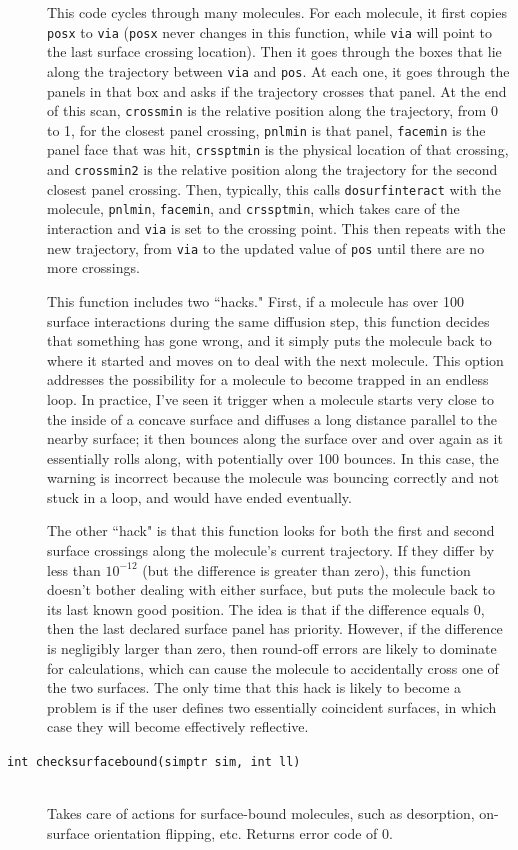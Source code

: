 \documentclass {scrbook}
\newcommand {\ttt} {\texttt}
\begin{document}
\begin{description}
This code cycles through many molecules. For each molecule, it first copies \ttt{posx} to \ttt{via} (\ttt{posx} never changes in this function, while \ttt{via} will point to the last surface crossing location). Then it goes through the boxes that lie along the trajectory between \ttt{via} and \ttt{pos}. At each one, it goes through the panels in that box and asks if the trajectory crosses that panel. At the end of this scan, \ttt{crossmin} is the relative position along the trajectory, from 0 to 1, for the closest panel crossing, \ttt{pnlmin} is that panel, \ttt{facemin} is the panel face that was hit, \ttt{crssptmin} is the physical location of that crossing, and \ttt{crossmin2} is the relative position along the trajectory for the second closest panel crossing. Then, typically, this calls \ttt{dosurfinteract} with the molecule, \ttt{pnlmin}, \ttt{facemin}, and \ttt{crssptmin}, which takes care of the interaction and \ttt{via} is set to the crossing point. This then repeats with the new trajectory, from \ttt{via} to the updated value of \ttt{pos} until there are no more crossings.

This function includes two ``hacks." First, if a molecule has over 100 surface interactions during the same diffusion step, this function decides that something has gone wrong, and it simply puts the molecule back to where it started and moves on to deal with the next molecule. This option addresses the possibility for a molecule to become trapped in an endless loop. In practice, I've seen it trigger when a molecule starts very close to the inside of a concave surface and diffuses a long distance parallel to the nearby surface; it then bounces along the surface over and over again as it essentially rolls along, with potentially over 100 bounces. In this case, the warning is incorrect because the molecule was bouncing correctly and not stuck in a loop, and would have ended eventually.

The other ``hack" is that this function looks for both the first and second surface crossings along the molecule's current trajectory. If they differ by less than $10^{-12}$ (but the difference is greater than zero), this function doesn't bother dealing with either surface, but puts the molecule back to its last known good position. The idea is that if the difference equals 0, then the last declared surface panel has priority. However, if the difference is negligibly larger than zero, then round-off errors are likely to dominate for calculations, which can cause the molecule to accidentally cross one of the two surfaces. The only time that this hack is likely to become a problem is if the user defines two essentially coincident surfaces, in which case they will become effectively reflective.

\item[\ttt{int checksurfacebound(simptr sim, int ll)}]
\hfill \\
Takes care of actions for surface-bound molecules, such as desorption, on-surface orientation flipping, etc. Returns error code of 0.

\end{description}
\end{document}
